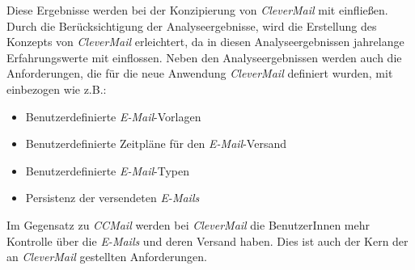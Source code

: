 Diese Ergebnisse werden bei der Konzipierung von \emph{CleverMail} mit einfließen. Durch die Berücksichtigung der Analyseergebnisse, wird die Erstellung des Konzepts von \emph{CleverMail} erleichtert, da in diesen Analyseergebnissen jahrelange Erfahrungswerte mit einflossen. 
\newline
\newline
Neben den Analyseergebnissen werden auch die Anforderungen, die für die neue Anwendung \emph{CleverMail} definiert wurden, mit einbezogen wie z.B.:
\begin{itemize}
	\item Benutzerdefinierte \emph{E-Mail}-Vorlagen
	\item Benutzerdefinierte Zeitpläne für den \emph{E-Mail}-Versand
	\item Benutzerdefinierte \emph{E-Mail}-Typen
	\item Persistenz der versendeten \emph{E-Mails}
\end{itemize} 
Im Gegensatz zu \emph{CCMail} werden bei \emph{CleverMail} die BenutzerInnen mehr Kontrolle über die \emph{E-Mails} und deren Versand haben. Dies ist auch der Kern der an \emph{CleverMail} gestellten Anforderungen.